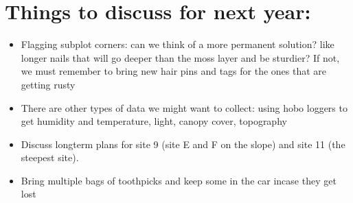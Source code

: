 \documentclass{article}\usepackage[]{graphicx}\usepackage[]{color}
\begin{document}
\section*{Things to discuss for next year:}

\begin{itemize}
\item Flagging subplot corners: can we think of a more permanent solution? like longer nails that will go deeper than the moss layer and be sturdier? If not, we must remember to bring new hair pins and tags for the ones that are getting rusty 
\item There are other types of data we might want to collect: using hobo loggers to get humidity and temperature, light, canopy cover, topography
\item Discuss longterm plans for site 9 (site E and F on the slope) and site 11 (the steepest site).
\item Bring multiple bags of toothpicks and keep some in the car incase they get lost
\end{itemize}
\end{document}
